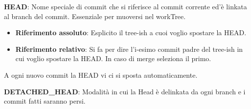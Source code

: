 \bigskip

\textbf{HEAD}: Nome speciale di commit che si riferisce al commit corrente ed'è linkata al branch del commit. Essenziale per muoversi nel workTree.

\begin{itemize}
	\item \textbf{Riferimento assoluto}: Esplicito il tree-ish a cuoi voglio spostare la HEAD.

	\item \textbf{Riferimento relativo}: Si fa  per dire l'i-esimo commit padre del tree-ish in cui voglio spostare la HEAD. In caso di merge seleziona il primo.
\end{itemize}

A ogni nuovo commit la HEAD vi ci si sposta automaticamente.

\bigskip

\textbf{DETACHED\_HEAD}: Modalità in cui la Head è delinkata da ogni branch e i commit fatti saranno persi.

